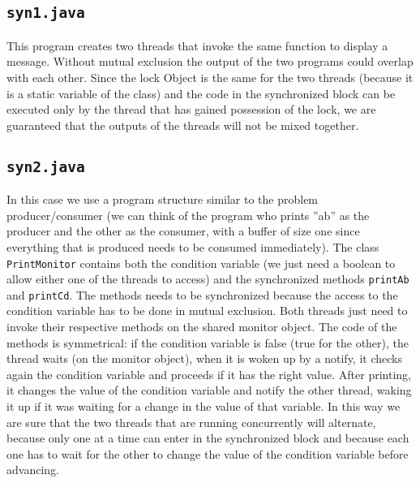 \subsection{\texttt{syn1.java}}
This program creates two threads that invoke the same function to display a message. Without mutual exclusion the output of the two programs could overlap with each other. Since the lock Object is the same for the two threads (because it is a static variable of the class) and the code in the synchronized block can be executed only by the thread that has gained possession of the lock, we are guaranteed that the outputs of the threads will not be mixed together.
\subsection{\texttt{syn2.java}}
In this case we use a program structure similar to the problem producer/consumer (we can think of the program who prints ''ab'' as the producer and the other as the consumer, with a buffer of size one since everything that is produced needs to be consumed immediately). \newline
The class \texttt{PrintMonitor} contains both the condition variable (we just need a boolean to allow either one of the threads to access) and the synchronized methods \texttt{printAb} and \texttt{printCd}. The methods needs to be synchronized because the access to the condition variable has to be done in mutual exclusion. \newline
Both threads just need to invoke their respective methods on the shared monitor object. The code of the methods is symmetrical: if the condition variable is false (true for the other), the thread waits (on the monitor object), when it is woken up by a notify, it checks again the condition variable and proceeds if it has the right value. After printing, it changes the value of the condition variable and notify the other thread, waking it up if it was waiting for a change in the value of that variable. In this way we are sure that the two threads that are running concurrently will alternate, because only one at a time can enter in the synchronized block and because each one has to wait for the other to change the value of the condition variable before advancing.

\clearpage



